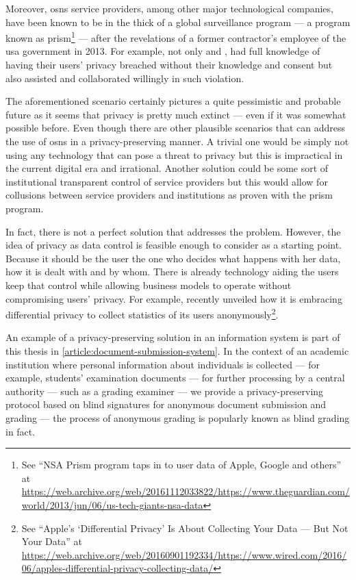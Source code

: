 \documentclass[showtrims,oldfontcommands]{kthesis}
\begin{document}
Moreover, \acp{osn} service providers, among other major technological companies, 
have been known to be in the thick of a global surveillance program --- a program 
known as \Ac{prism}\footnote{See ``NSA Prism program taps in to user data of Apple, Google and others'' at \url{https://web.archive.org/web/20161112033822/https://www.theguardian.com/world/2013/jun/06/us-tech-giants-nsa-data}} --- 
after the revelations of a former contractor's employee of the \ac{usa} government 
in 2013. For example, not only \Facebook and \Google, had full knowledge of having 
their users' privacy breached without their knowledge and consent but also assisted 
and collaborated willingly in such violation.

The aforementioned scenario certainly pictures a quite pessimistic and probable 
future as it seems that privacy is pretty much extinct --- even if it was somewhat 
possible before. Even though there are other plausible scenarios that can address the use of 
\acp{osn} in a privacy-preserving manner. A trivial one would be simply not using 
any technology that can pose a threat to privacy but this is impractical in the 
current digital era and irrational. Another solution could be some sort of institutional 
transparent control of service providers but this would allow for collusions between 
service providers and institutions as proven with the \ac{prism} program.

In fact, there is not a perfect solution that addresses the problem. However, the 
idea of privacy as data control is feasible enough to consider as a starting point. 
Because it should be the user the one who decides what happens with her data, how 
it is dealt with and by whom. There is already technology aiding the users keep 
that control while allowing business models to operate without compromising users' 
privacy. For example, \Apple recently unveiled how it is embracing differential 
privacy to collect statistics of its users anonymously\footnote{See ``Apple's `Differential Privacy' Is About Collecting Your Data --- But Not Your Data'' at \url{https://web.archive.org/web/20160901192334/https://www.wired.com/2016/06/apples-differential-privacy-collecting-data/}}.

An example of a privacy-preserving solution in an information system is part of 
this thesis in \cref{article:document-submission-system}. In the context of an academic 
institution where personal information about individuals is collected --- for example, 
students' examination documents --- for further processing by a central authority 
--- such as a grading examiner --- we provide a privacy-preserving protocol based 
on blind signatures for anonymous document submission and grading --- the process 
of anonymous grading is popularly known as blind grading in fact. 
\end{document}
